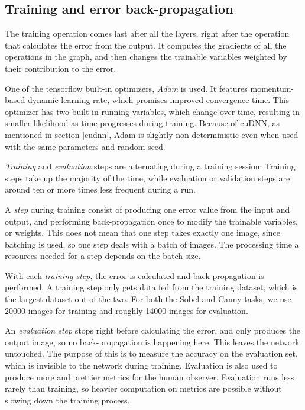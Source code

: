 \documentclass[12pt]{report}
\begin{document}
\subsection{Training and error back-propagation} \label{train}
The training operation comes last after all the layers, right after the operation that calculates the error from the output. It computes the gradients of all the operations in the graph, and then changes the trainable variables weighted by their contribution to the error.\par
One of the tensorflow built-in optimizers, \textit{Adam} is used. It features momentum-based dynamic learning rate, which promises improved convergence time. This optimizer has two built-in running variables, which change over time, resulting in smaller likelihood as time progresses during training. Because of cuDNN, as mentioned in section \ref{cudnn}, Adam is slightly non-deterministic even when used with the same parameters and random-seed.\par
\textit{Training} and \textit{evaluation} steps are alternating during a training session. Training steps take up the majority of the time, while evaluation or validation steps are around ten or more times less frequent during a run.\par
A \textit{step} during training consist of producing one error value from the input and output, and performing back-propagation once to modify the trainable variables, or weights. This does not mean that one step takes exactly one image, since batching is used, so one step deals with a batch of images. The processing time a resources needed for a step depends on the batch size.\par
With each \textit{training step}, the error is calculated and back-propagation is performed. A training step only gets data fed from the training dataset, which is the largest dataset out of the two. For both the Sobel and Canny tasks, we use 20000 images for training and roughly 14000 images for evaluation.\par
An \textit{evaluation step} stops right before calculating the error, and only produces the output image, so no back-propagation is happening here. This leaves the network untouched. The purpose of this is to measure the accuracy on the evaluation set, which is invisible to the network during training. Evaluation is also used to produce more and prettier metrics for the human observer. Evaluation runs less rarely than training, so heavier computation on metrics are possible without slowing down the training process.
\end{document}
